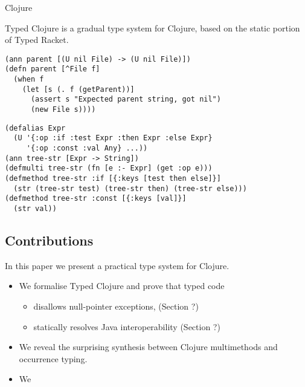 
Clojure

Typed Clojure is a gradual type system for Clojure, based on the
static portion of Typed Racket.

\begin{verbatim}
(ann parent [(U nil File) -> (U nil File)])
(defn parent [^File f]
  (when f
    (let [s (. f (getParent))]
      (assert s "Expected parent string, got nil")
      (new File s))))
\end{verbatim}




\begin{verbatim}
(defalias Expr
  (U '{:op :if :test Expr :then Expr :else Expr}
     '{:op :const :val Any} ...))
(ann tree-str [Expr -> String])
(defmulti tree-str (fn [e :- Expr] (get :op e)))
(defmethod tree-str :if [{:keys [test then else]}] 
  (str (tree-str test) (tree-str then) (tree-str else)))
(defmethod tree-str :const [{:keys [val]}] 
  (str val))
\end{verbatim}

\subsection{Contributions}

In this paper we present a practical type system for Clojure.

\begin{itemize}

  \item We formalise Typed Clojure and prove that typed code
    \begin{itemize}
      \item disallows null-pointer exceptions, (Section ?)
      \item statically resolves Java interoperability (Section ?)
    \end{itemize}
  \item We reveal the surprising synthesis between Clojure multimethods
        and occurrence typing.
  \item We 
\end{itemize}

